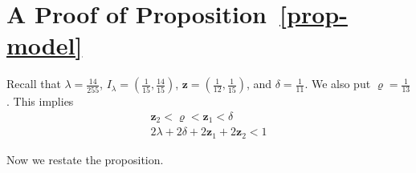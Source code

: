 \documentclass[a4paper,UKenglish,cleveref, autoref, thm-restate]{lipics-v2021}
\renewcommand{\vec}[1]{\pmb{#1}}
\begin{document}
\section{A Proof of Proposition~\ref{prop-model}}
\label{app-two-counter-extension}

Recall that $\lambda = \frac{14}{255}$, $I_\lambda =(\frac{1}{15},\frac{14}{15})$, $\vec{z} = (\frac{1}{12},\frac{1}{15})$, and $\delta = \frac{1}{11}$.  
We also put $\varrho = \frac{1}{13}$. This implies
\begin{eqnarray}
\vec{z}_2 < \varrho < \vec{z}_1 <\delta \label{in-cons-one}\\
2\lambda + 2\delta + 2\vec{z}_1 + 2\vec{z}_2 < 1 \label{in-cons-two}
\end{eqnarray}

\noindent
Now we restate the proposition.
\newtheorem{innercustomprop}{Proposition}
\newenvironment{customprop}[1]
  {\renewcommand\theinnercustomprop{#1}\innercustomprop}
  {\endinnercustomprop}
\end{document}

